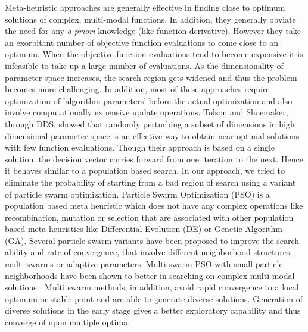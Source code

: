 \documentclass[12pt]{article}
\begin{document}
Meta-heuristic approaches are generally effective in finding close to optimum solutions of complex, multi-modal functions. In addition, they generally obviate the need for any \textit{a priori} knowledge (like function derivative). However they take an exorbitant number of objective function evaluations to come close to an optimum. When the objective function evaluations tend to become expensive it is infeasible to take up a large number of evaluations. As the dimensionality of parameter space increases, the search region gets widened and thus the problem becomes more challenging.  In addition, most of these approaches require optimization of  'algorithm parameters' before the actual optimization and also involve computationally expensive update operations.  Tolson and Shoemaker, through DDS, showed that randomly perturbing a subset of dimensions in high dimensional parameter space is an effective way to obtain near optimal solutions with few function evaluations. Though their approach is based on a single solution, the decision vector carries forward from one iteration to the next. Hence it behaves similar to a population based search. In our approach, we tried to eliminate the probability of starting from a bad region of search using a variant of particle swarm optimization. Particle Swarm Optimization (PSO) is a population based meta heuristic which does not have any complex operations like recombination, mutation or selection that are associated with other population based meta-heuristics like Differential Evolution (DE) or Genetic Algorithm (GA). Several particle swarm variants have been proposed to improve the search ability and rate of convergence, that involve different neighborhood structures, multi-swarms or adaptive parameters. Multi-swarm PSO with small particle neighborhoods have been shown to better in searching on complex multi-modal solutions \cite{zhao2008dynamic}. Multi swarm methods, in addition, avoid rapid convergence to a local optimum or stable point and are able to generate diverse solutions.  Generation of diverse solutions in the early stage gives a better exploratory capability and thus converge of upon multiple optima.
\end{document}
